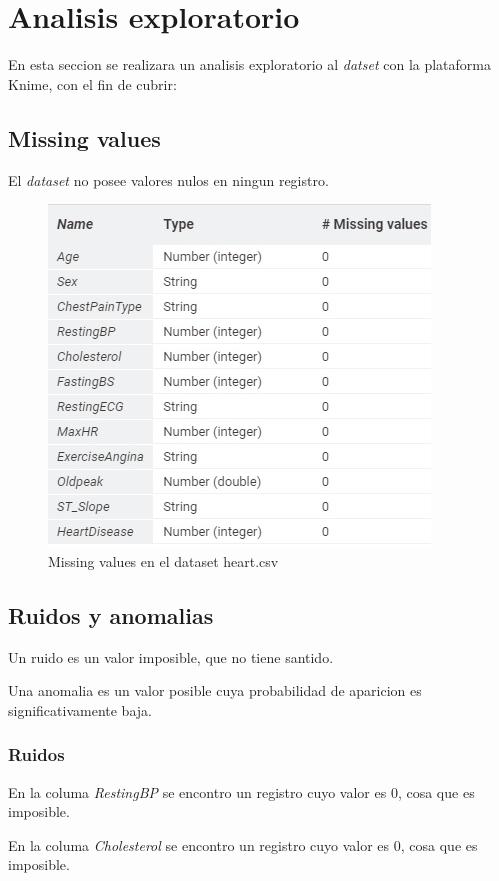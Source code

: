 \documentclass[12pt, letterpaper]{article}
\begin{document}
\section{Analisis exploratorio}
En esta seccion se realizara un analisis exploratorio al \textit{datset} 
con la plataforma Knime, con el fin de cubrir:

\subsection{Missing values}
El \textit{dataset} no posee valores nulos en ningun registro.
\begin{figure}[h]
    \centering
    \includegraphics[scale=1]{missing_values.jpg}
    \caption{Missing values en el dataset heart.csv}
    \label{fig:missing_values}
\end{figure}

\subsection{Ruidos y anomalias}

Un ruido es un valor imposible, que no tiene santido.

Una anomalia es un valor posible cuya probabilidad de aparicion es significativamente baja.

\subsubsection{Ruidos}
En la columa \textit{RestingBP} se encontro un registro cuyo valor es 0, cosa que es imposible.

En la columa \textit{Cholesterol} se encontro un registro cuyo valor es 0, cosa que es imposible.
\end{document}
